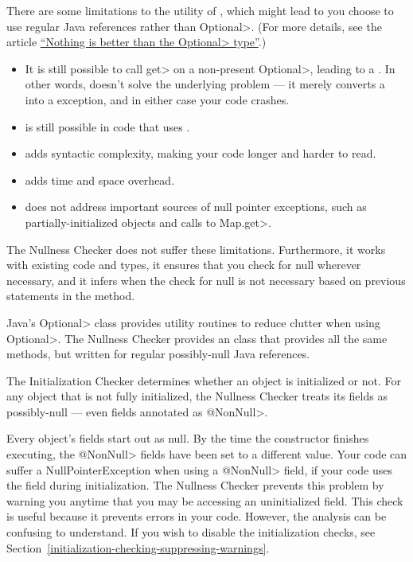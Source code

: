 There are some limitations to the utility of , which might
lead to you choose to use regular Java references rather than \<Optional>.
(For more details, see the article
\href{https://homes.cs.washington.edu/~mernst/advice/nothing-is-better-than-optional.html}{``Nothing
  is better than the \<Optional> type''}.)

\begin{itemize}
\item
  It is still possible to call \<get> on a non-present \<Optional>, leading
  to a .  In other words, 
  doesn't solve the underlying problem --- it merely converts a
   into a 
  exception, and in either case your code crashes.
\item
   is still possible in code that uses .
\item
   adds syntactic complexity, making your code longer and harder to
  read.
\item
   adds time and space overhead.
\item
   does not address important sources of null pointer
  exceptions, such as partially-initialized objects and calls to \<Map.get>.
\end{itemize}

The Nullness Checker does not suffer these limitations.  Furthermore, it
works with existing code and types, it ensures that you check for null
wherever necessary, and it infers when the check for null is not necessary
based on previous statements in the method.

Java's \<Optional> class provides utility routines to reduce clutter when
using \<Optional>.  The Nullness Checker provides an
 class that provides all the same methods,
but written for regular possibly-null Java references.



The Initialization Checker determines whether an object is initialized or
not.  For any object that is not fully initialized, the Nullness Checker
treats its fields as possibly-null --- even fields annotated as
\<@NonNull>.

Every object's fields start out as null.  By the time the constructor
finishes executing, the \<@NonNull> fields have been set to a different
value.  Your code can suffer a NullPointerException when using a
\<@NonNull> field, if your code uses the field during initialization.
The Nullness Checker prevents this problem by warning you anytime that you
may be accessing an uninitialized field.  This check is useful because it
prevents errors in your code.  However, the analysis can be confusing to
understand.  If you wish to disable the initialization checks, see
Section~\ref{initialization-checking-suppressing-warnings}.


